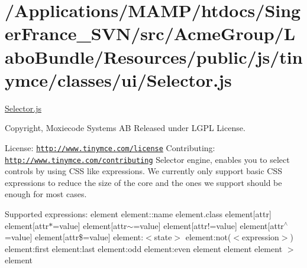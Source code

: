 \hypertarget{_2_applications_2_m_a_m_p_2htdocs_2_singer_france__s_v_n_2src_2_acme_group_2_labo_bundle_2_resoua797fc1c93295ce755ea2b7334207fd0}{\section{/\+Applications/\+M\+A\+M\+P/htdocs/\+Singer\+France\+\_\+\+S\+V\+N/src/\+Acme\+Group/\+Labo\+Bundle/\+Resources/public/js/tinymce/classes/ui/\+Selector.\+js}
}
\hyperlink{_selector_8js}{Selector.\+js}

Copyright, Moxiecode Systems A\+B Released under L\+G\+P\+L License.

License\+: \href{http://www.tinymce.com/license}{\tt http\+://www.\+tinymce.\+com/license} Contributing\+: \href{http://www.tinymce.com/contributing}{\tt http\+://www.\+tinymce.\+com/contributing} Selector engine, enables you to select controls by using C\+S\+S like expressions. We currently only support basic C\+S\+S expressions to reduce the size of the core and the ones we support should be enough for most cases.

Supported expressions\+: element element\+::name element.\+class element\mbox{[}attr\mbox{]} element\mbox{[}attr$\ast$=value\mbox{]} element\mbox{[}attr$\sim$=value\mbox{]} element\mbox{[}attr!=value\mbox{]} element\mbox{[}attr$^\wedge$=value\mbox{]} element\mbox{[}attr\$=value\mbox{]} element\+:$<$state$>$ element\+:not($<$expression$>$) element\+:first element\+:last element\+:odd element\+:even element element element $>$ element


\begin{DoxyCodeInclude}
\end{DoxyCodeInclude}
 